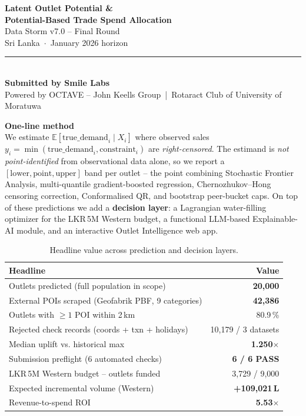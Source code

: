\documentclass[10pt,a4paper]{article}
\newcommand{\panel}[2]{%
  \begin{center}\colorbox{panelbg}{%
  \begin{minipage}{0.96\linewidth}\vspace{2pt}
  {\bfseries\color{primary}#1}\\[1pt]\small #2
  \vspace{3pt}\end{minipage}}\end{center}}
\begin{document}
\begin{center}
{\LARGE\bfseries\color{primary} Latent Outlet Potential \&\\[2pt]
Potential-Based Trade Spend Allocation}\\[6pt]
{\large Data Storm v7.0 -- Final Round}\\[2pt]
{\normalsize Sri Lanka \,$\cdot$\, January 2026 horizon}\\[6pt]
\rule{0.55\textwidth}{0.4pt}\\[5pt]
{\large\bfseries Submitted by Smile Labs}\\[2pt]
{\small Powered by OCTAVE -- John Keells Group \,|\, Rotaract Club of University of Moratuwa}
\end{center}
\vspace{2pt}

\panel{One-line method}{%
We estimate $\mathbb{E}[\text{true\_demand}_i \mid X_i]$ where observed sales
$y_i=\min(\text{true\_demand}_i,\text{constraint}_i)$ are \emph{right-censored}.
The estimand is \emph{not point-identified} from observational data alone, so we
report a $[\text{lower},\text{point},\text{upper}]$ band per outlet -- the point
combining Stochastic Frontier Analysis, multi-quantile gradient-boosted
regression, Chernozhukov--Hong censoring correction, Conformalised QR, and
bootstrap peer-bucket caps. On top of these predictions we add a \textbf{decision
layer}: a Lagrangian water-filling optimizer for the LKR\,5M Western budget, a
functional LLM-based Explainable-AI module, and an interactive Outlet
Intelligence web app.}

\begin{table}[H]
\centering\small
\begin{tabularx}{\textwidth}{Yr}
\toprule
\textbf{Headline} & \textbf{Value}\\
\midrule
Outlets predicted (full population in scope) & \textbf{20,000}\\
External POIs scraped (Geofabrik PBF, 9 categories) & \textbf{42,386}\\
Outlets with $\ge 1$ POI within 2\,km & 80.9\,\%\\
Rejected check records (coords + txn + holidays) & 10,179 / 3 datasets\\
Median uplift vs. historical max & \textbf{1.250$\times$}\\
Submission preflight (6 automated checks) & \textbf{6 / 6 PASS}\\
LKR\,5M Western budget -- outlets funded & 3,729 / 9,000\\
Expected incremental volume (Western) & \textbf{+109,021\,L}\\
Revenue-to-spend ROI & \textbf{5.53$\times$}\\
\bottomrule
\end{tabularx}
\caption{Headline value across prediction and decision layers.}
\end{table}
\end{document}
